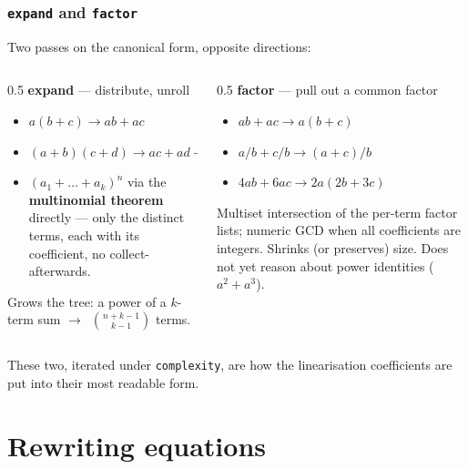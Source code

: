 \documentclass[10pt,slidestop]{beamer}
\newcommand{\code}[1]{\texttt{#1}}
\newcommand{\ra}{$\rightarrow$}
\begin{document}
\begin{frame}\frametitle{\texttt{expand} and \texttt{factor}}
  Two passes on the canonical form, opposite directions:

  \begin{columns}[t]
  \begin{column}{0.5\textwidth}
    \textbf{expand} --- distribute, unroll
    \begin{itemize}\small
    \item $a(b+c)\to ab+ac$
    \item $(a{+}b)(c{+}d)\to ac{+}ad{+}bc{+}bd$
    \item $(a_1{+}\dots{+}a_k)^n$ via the \textbf{multinomial theorem} directly
      --- only the distinct terms, each with its coefficient, no
      collect-afterwards.
    \end{itemize}
    \smallskip
    Grows the tree: a power of a $k$-term sum \ra\ $\binom{n+k-1}{k-1}$ terms.
  \end{column}
  \begin{column}{0.5\textwidth}
    \textbf{factor} --- pull out a common factor
    \begin{itemize}\small
    \item $ab+ac\to a(b+c)$
    \item $a/b+c/b\to (a+c)/b$
    \item $4ab+6ac\to 2a(2b+3c)$
    \end{itemize}
    \smallskip
    Multiset intersection of the per-term factor lists; numeric GCD when all
    coefficients are integers. Shrinks (or preserves) size. Does not yet reason
    about power identities ($a^2+a^3$).
  \end{column}
  \end{columns}

  \medskip
  These two, iterated under \code{complexity}, are how the linearisation
  coefficients are put into their most readable form.
\end{frame}

\section{Rewriting equations}
\end{document}
